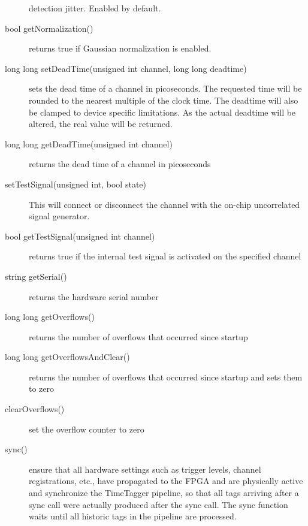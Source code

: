 \documentclass[letterpaper,10pt,english]{sphinxmanual}
\begin{document}
\begin{description}
detection jitter. Enabled by default.

\item[{bool getNormalization()}] \leavevmode
returns true if Gaussian normalization is enabled.

\item[{long long setDeadTime(unsigned int channel, long long deadtime)}] \leavevmode
sets the dead time of a channel in picoseconds. The requested time will
be rounded to the nearest multiple of the clock time. The deadtime will also
be clamped to device specific limitations. As the actual deadtime will
be altered, the real value will be returned.

\item[{long long getDeadTime(unsigned int channel)}] \leavevmode
returns the dead time of a channel in picoseconds

\item[{setTestSignal(unsigned int, bool state)}] \leavevmode
This will connect or disconnect the channel with the on-chip
uncorrelated signal generator.

\item[{bool getTestSignal(unsigned int channel)}] \leavevmode
returns true if the internal test signal is activated on the specified channel

\item[{string getSerial()}] \leavevmode
returns the hardware serial number

\item[{long long getOverflows()}] \leavevmode
returns the number of overflows that occurred since startup

\item[{long long getOverflowsAndClear()}] \leavevmode
returns the number of overflows that occurred since startup and sets them to zero

\item[{clearOverflows()}] \leavevmode
set the overflow counter to zero

\item[{sync()}] \leavevmode
ensure that all hardware settings such as trigger levels,
channel registrations, etc., have propagated to the FPGA
and are physically active and synchronize the TimeTagger pipeline,
so that all tags arriving after a sync call were actually produced
after the sync call. The sync function waits until all historic
tags in the pipeline are processed.

\end{description}
\end{document}
